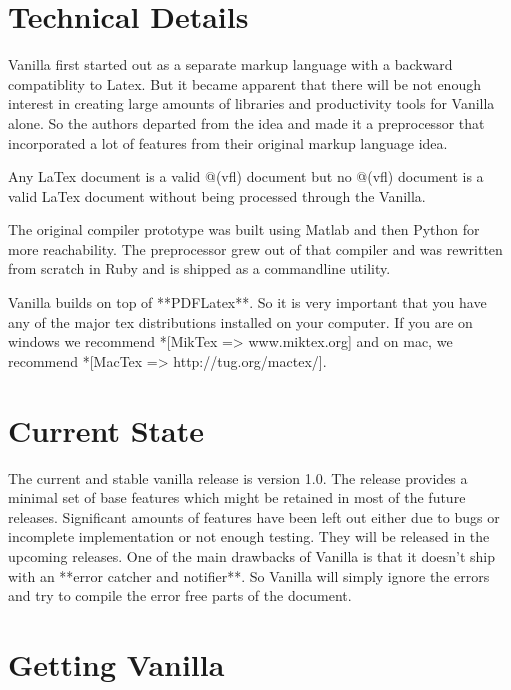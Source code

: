 \documentclass{article}
\begin{document}
\section*{Technical Details}

Vanilla first started out as a separate markup language with a backward compatiblity to Latex. But it became apparent that there will be not enough interest in creating large amounts of libraries and productivity tools for Vanilla alone. So the authors departed from the idea and made it a preprocessor that incorporated a lot of features from their original markup language idea. \vspace{5pt}

Any LaTex document is a valid @(vfl) document but no @(vfl) document is a valid LaTex document without being processed through the Vanilla. \vspace{5pt}

The original compiler prototype was built using Matlab and then Python for more reachability. The preprocessor grew out of that compiler and was rewritten from scratch in Ruby and is shipped as a commandline utility.\vspace{5pt}

Vanilla builds on top of **PDFLatex**. So it is very important that you have any of the major tex distributions installed on your computer. If you are on windows we recommend *[MikTex => www.miktex.org] and on mac, we recommend *[MacTex => http://tug.org/mactex/]. \vspace{5pt}

\section*{Current State}

The current and stable vanilla release is version 1.0. The release provides a minimal set of base features which might be retained in most of the future releases. Significant amounts of features have been left out either due to bugs or incomplete implementation or not enough testing. They will be released in the upcoming releases. One of the main drawbacks of Vanilla is that it doesn't ship with an **error catcher and notifier**.  So Vanilla will simply ignore the errors and try to compile the error free parts of the document.\vspace{5pt}

\section*{Getting Vanilla}
\end{document}
